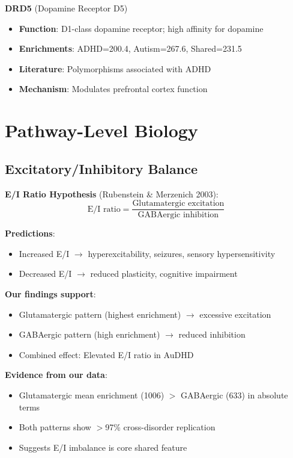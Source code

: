 \documentclass[12pt,letterpaper]{article}
\begin{document}
\textbf{DRD5} (Dopamine Receptor D5)
\begin{itemize}
    \item \textbf{Function}: D1-class dopamine receptor; high affinity for dopamine
    \item \textbf{Enrichments}: ADHD=200.4, Autism=267.6, Shared=231.5
    \item \textbf{Literature}: Polymorphisms associated with ADHD
    \item \textbf{Mechanism}: Modulates prefrontal cortex function
\end{itemize}

\section{Pathway-Level Biology}

\subsection{Excitatory/Inhibitory Balance}

\textbf{E/I Ratio Hypothesis} (Rubenstein \& Merzenich 2003):
\begin{equation}
\text{E/I ratio} = \frac{\text{Glutamatergic excitation}}{\text{GABAergic inhibition}}
\end{equation}

\textbf{Predictions}:
\begin{itemize}
    \item Increased E/I $\rightarrow$ hyperexcitability, seizures, sensory hypersensitivity
    \item Decreased E/I $\rightarrow$ reduced plasticity, cognitive impairment
\end{itemize}

\textbf{Our findings support}:
\begin{itemize}
    \item Glutamatergic pattern (highest enrichment) $\rightarrow$ excessive excitation
    \item GABAergic pattern (high enrichment) $\rightarrow$ reduced inhibition
    \item Combined effect: Elevated E/I ratio in AuDHD
\end{itemize}

\textbf{Evidence from our data}:
\begin{itemize}
    \item Glutamatergic mean enrichment (1006) $>$ GABAergic (633) in absolute terms
    \item Both patterns show $>$97\% cross-disorder replication
    \item Suggests E/I imbalance is core shared feature
\end{itemize}
\end{document}

